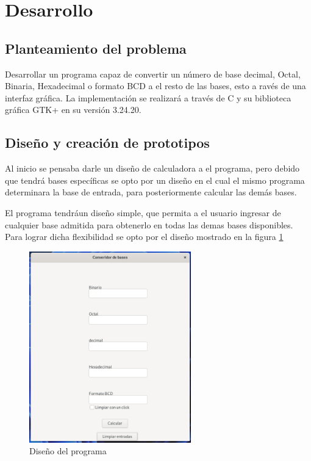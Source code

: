 \documentclass[letterpaper,12pt]{extarticle}%
\begin{document}
    
		
	\section{Desarrollo}
	\subsection{Planteamiento del problema}
		Desarrollar un programa capaz de convertir un número de base decimal,
		Octal, Binaria, Hexadecimal o formato BCD a el resto de las bases, esto
		a ravés de una interfaz	gráfica. La implementación se realizará a través
		de C y su biblioteca gráfica GTK+ en su versión 3.24.20.

	\subsection{Diseño y creación de prototipos}
		Al inicio se pensaba darle un diseño de calculadora a el programa, pero 
		debido que tendrá bases específicas se opto por un diseño en el cual el 
		mismo programa determinara la base de entrada, para posteriormente calcular
		las demás bases.

		El programa tendráun diseño simple, que permita a el usuario ingresar
		de cualquier base admitida para obtenerlo en todas las demas bases 
		disponibles. Para lograr dicha flexibilidad se opto por el diseño
		mostrado en la figura \ref{ProgramDesign}

		\begin{figure}[H]
		\begin{center}
		\includegraphics[width=7cm]{imag//ProgramDesign.png}
		\caption{Diseño del programa}
		\label{ProgramDesign}
		\end{center}
 		\end{figure}
\end{document}
